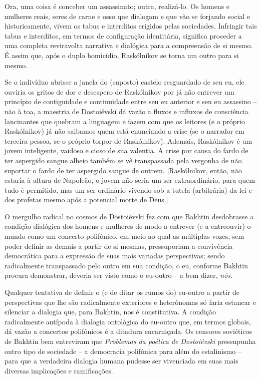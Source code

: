Ora, uma coisa é conceber um assassinato; outra, realizá-lo. Os homens e
mulheres reais, seres de carne e osso que dialogam e que vão se forjando
social e historicamente, vivem os tabus e interditos erigidos pelas
sociedades. Infringir tais tabus e interditos, em termos de configuração
identitária, significa proceder a uma completa reviravolta narrativa e
dialógica para a compreensão de si mesmo. É assim que, após o duplo
homicídio, Raskólnikov se torna um outro para si mesmo.

Se o indivíduo abrisse a janela do (suposto) castelo resguardado de seu
eu, ele ouviria os gritos de dor e desespero de Raskólnikov por já não
entrever um princípio de contiguidade e continuidade entre seu eu
anterior e seu eu assassino -- não à toa, a maestria de Dostoiévski dá
vazão a fluxos e influxos de consciência lancinantes que quebram a
linguagem e fazem com que os leitores (e o próprio Raskólnikov) já não
saibamos quem está enunciando a crise (se o narrador em terceira pessoa,
se o próprio torpor de Raskólnikov). Ademais, Raskólnikov é um jovem
inteligente, vaidoso e cioso de sua valentia. A crise por causa do fardo
de ter aspergido sangue alheio também se vê transpassada pela vergonha
de não suportar o fardo de ter aspergido sangue de outrem.
{[}Raskólnikov, então, não estaria à altura de Napoleão, o jovem não
seria um ser extraordinário, para quem tudo é permitido, mas um ser
ordinário vivendo sob a tutela (arbitrária) da lei e dos profetas mesmo
após a potencial morte de Deus.{]}

O mergulho radical no cosmos de Dostoiévski fez com que Bakhtin
desdobrasse a condição dialógica dos homens e mulheres de modo a
entrever (e a entreouvir) o mundo como um concerto polifônico, em meio
ao qual as múltiplas vozes, sem poder definir as demais a partir de si
mesmas, pressuporiam a convivência democrática para a expressão de suas
mais variadas perspectivas; sendo radicalmente transpassado pelo outro
em sua condição, o eu, conforme Bakhtin procura demonstrar, deveria ser
visto como o eu-outro -- a bem dizer, \emph{nós.}

Qualquer tentativa de definir o (e de ditar os rumos do) eu-outro a
partir de perspectivas que lhe são radicalmente exteriores e heterônomas
só faria estancar e silenciar a dialogia que, para Bakhtin, nos é
constitutiva. A condição radicalmente antípoda à dialogia ontológica do
eu-outro que, em termos globais, dá vazão a concertos polifônicos é a
ditadura encarniçada. Os censores soviéticos de Bakhtin bem entreviram
que \emph{Problemas da poética de Dostoiévski} pressupunha outro tipo de
sociedade -- a democracia polifônica para além do estalinismo -- para
que a verdadeira dialogia humana pudesse ser vivenciada em suas mais
diversas implicações e ramificações.

